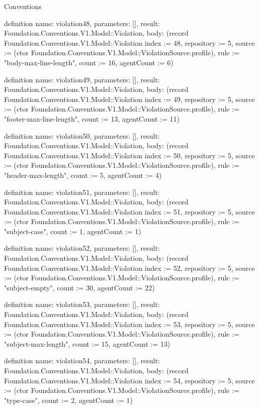 \begin{lexlean}{Conventions}
\begin{semanticmodule}
definition{
  name: violation48,
  parameters: [],
  result: Foundation.Conventions.V1.Model::Violation,
  body: (record Foundation.Conventions.V1.Model::Violation {index := 48, repository := 5, source := (ctor Foundation.Conventions.V1.Model::ViolationSource.profile), rule := "body-max-line-length", count := 16, agentCount := 6})
}

definition{
  name: violation49,
  parameters: [],
  result: Foundation.Conventions.V1.Model::Violation,
  body: (record Foundation.Conventions.V1.Model::Violation {index := 49, repository := 5, source := (ctor Foundation.Conventions.V1.Model::ViolationSource.profile), rule := "footer-max-line-length", count := 13, agentCount := 11})
}

definition{
  name: violation50,
  parameters: [],
  result: Foundation.Conventions.V1.Model::Violation,
  body: (record Foundation.Conventions.V1.Model::Violation {index := 50, repository := 5, source := (ctor Foundation.Conventions.V1.Model::ViolationSource.profile), rule := "header-max-length", count := 5, agentCount := 4})
}

definition{
  name: violation51,
  parameters: [],
  result: Foundation.Conventions.V1.Model::Violation,
  body: (record Foundation.Conventions.V1.Model::Violation {index := 51, repository := 5, source := (ctor Foundation.Conventions.V1.Model::ViolationSource.profile), rule := "subject-case", count := 1, agentCount := 1})
}

definition{
  name: violation52,
  parameters: [],
  result: Foundation.Conventions.V1.Model::Violation,
  body: (record Foundation.Conventions.V1.Model::Violation {index := 52, repository := 5, source := (ctor Foundation.Conventions.V1.Model::ViolationSource.profile), rule := "subject-empty", count := 30, agentCount := 22})
}

definition{
  name: violation53,
  parameters: [],
  result: Foundation.Conventions.V1.Model::Violation,
  body: (record Foundation.Conventions.V1.Model::Violation {index := 53, repository := 5, source := (ctor Foundation.Conventions.V1.Model::ViolationSource.profile), rule := "subject-max-length", count := 15, agentCount := 13})
}

definition{
  name: violation54,
  parameters: [],
  result: Foundation.Conventions.V1.Model::Violation,
  body: (record Foundation.Conventions.V1.Model::Violation {index := 54, repository := 5, source := (ctor Foundation.Conventions.V1.Model::ViolationSource.profile), rule := "type-case", count := 2, agentCount := 1})
}


\end{semanticmodule}
\end{lexlean}
